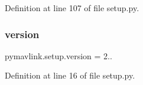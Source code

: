 Definition at line 107 of file setup.\+py.

\mbox{\label{namespacepymavlink_1_1setup_a4e79261a2d80e5c8ccaa814e5bcbfb22}} 
\subsubsection{\texorpdfstring{version}{version}}
{\footnotesize\ttfamily pymavlink.\+setup.\+version = \textquotesingle{}2..\textquotesingle{}}



Definition at line 16 of file setup.\+py.

